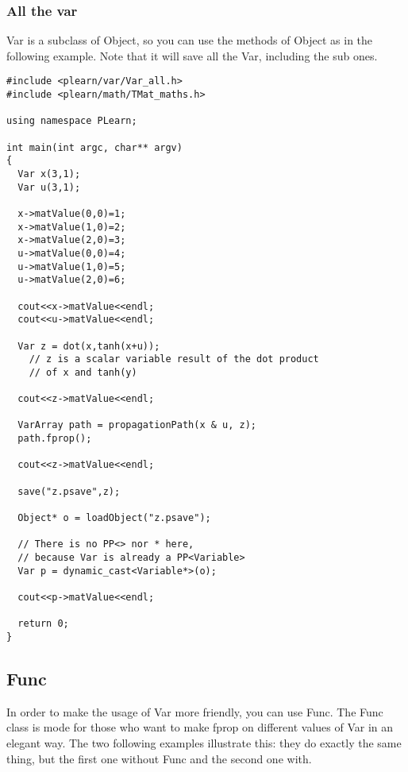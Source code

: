 \documentclass[11pt]{book}
\begin{document}
\subsubsection{All the var}

Var is a subclass of Object, so you can use the methods of Object
as in the following example. Note that it will save all the Var,
including the sub ones.

\begin{verbatim}
#include <plearn/var/Var_all.h>
#include <plearn/math/TMat_maths.h>

using namespace PLearn;

int main(int argc, char** argv)
{
  Var x(3,1);
  Var u(3,1);

  x->matValue(0,0)=1;
  x->matValue(1,0)=2;
  x->matValue(2,0)=3;
  u->matValue(0,0)=4;
  u->matValue(1,0)=5;
  u->matValue(2,0)=6;

  cout<<x->matValue<<endl;
  cout<<u->matValue<<endl;

  Var z = dot(x,tanh(x+u));
    // z is a scalar variable result of the dot product
    // of x and tanh(y)

  cout<<z->matValue<<endl;

  VarArray path = propagationPath(x & u, z);
  path.fprop();

  cout<<z->matValue<<endl;

  save("z.psave",z);

  Object* o = loadObject("z.psave");

  // There is no PP<> nor * here,
  // because Var is already a PP<Variable>
  Var p = dynamic_cast<Variable*>(o);

  cout<<p->matValue<<endl;

  return 0;
}
\end{verbatim}


\subsection{Func}

In order to make the usage of Var more friendly, you can use Func. The Func class is mode for those who want to make fprop on different values of Var in an elegant way. The two following examples illustrate this: they do exactly the same thing, but the first one without Func and the second one with.
\end{document}
